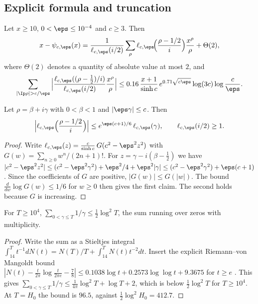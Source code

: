 \subsection{Explicit formula and truncation}
\begin{proposition}\label{prop:explicit}
Let $x \ge 10$, $0 < \eps \le 10^{-4}$ and $c \ge 3$. Then
\[
x - \psi_{c,\eps}(x) = \frac{1}{\ell_{c,\eps}(i/2)}\sum_\rho \ell_{c,\eps}\!\Big(\frac{\rho - 1/2}{i}\Big)\frac{x^\rho}{\rho} + \Theta(2),
\]
where $\Theta(2)$ denotes a quantity of absolute value at most $2$, and
\[
\sum_{|\Ip\rho| > c/\eps}\Big|\frac{\ell_{c,\eps}((\rho-\frac12)/i)}{\ell_{c,\eps}(i/2)}\frac{x^\rho}{\rho}\Big| \le 0.16\,\frac{x+1}{\sinh c}\,e^{0.71\sqrt{c\eps}}\log(3c)\log\frac c\eps .
\]
\end{proposition}

\begin{lemma}\label{lem:logancomplex}
Let $\rho = \beta + i\gamma$ with $0 < \beta < 1$ and $|\eps\gamma| \le c$. Then
\[
\Big|\ell_{c,\eps}\Big(\frac{\rho - 1/2}{i}\Big)\Big| \le e^{\eps(c+1)/6}\,\ell_{c,\eps}(\gamma),
\qquad \ell_{c,\eps}(i/2) \ge 1 .
\]
\end{lemma}

\begin{proof}
Write $\ell_{c,\eps}(z) = \frac{c}{\sinh c}\,G(c^2 - \eps^2z^2)$ with $G(w) = \sum_{n\ge0}w^n/(2n+1)!$.
For $z = \gamma - i(\beta-\frac12)$ we have
$|c^2 - \eps^2 z^2| \le (c^2 - \eps^2\gamma^2) + \eps^2/4 + \eps^2|\gamma| \le (c^2 - \eps^2\gamma^2) + \eps(c+1)$.
Since the coefficients of $G$ are positive, $|G(w)| \le G(|w|)$.
The bound $\frac{d}{dw}\log G(w) \le 1/6$ for $w \ge 0$ then gives the first claim.
The second holds because $G$ is increasing.
\end{proof}

\begin{lemma}\label{lem:sumrecip}
For $T \ge 10^4$, $\sum_{0<\gamma\le T} 1/\gamma \le \frac12\log^2 T$, the sum running over zeros with multiplicity.
\end{lemma}

\begin{proof}
Write the sum as a Stieltjes integral $\int_{14}^{T} t^{-1}dN(t) = N(T)/T + \int_{14}^T N(t)t^{-2}dt$.
Insert the explicit Riemann--von Mangoldt bound $|N(t) - \frac t{2\pi}\log\frac t{2\pi e} - \frac78| \le 0.1038\log t + 0.2573\log\log t + 9.3675$ for $t \ge e$ \cite{HSW}.
This gives $\sum_{0<\gamma\le T}1/\gamma \le \frac1{4\pi}\log^2T + \log T + 2$, which is below $\frac12\log^2T$ for $T \ge 10^4$.
At $T = H_0$ the bound is $96.5$, against $\frac12\log^2H_0 = 412.7$.
\end{proof}

